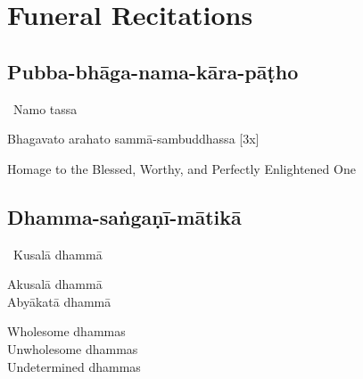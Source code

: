 \ifdesktopversion
{}
\else
{}
\fi

\chapter{Funeral Recitations}

\clearpage

\section{Pubba-bhāga-nama-kāra-pāṭho}
\label{pubba-bhaga-nama-kara-patho}

\begin{pali-leader}
  \anglebracketleft\ \hspace{-0.5mm}Namo tassa \hspace{-0.5mm}\anglebracketright\
\end{pali-leader}
\begin{pali-hangtogether}
Bhagavato arahato sammā-sambuddhassa \hfill{[3x]}
\end{pali-hangtogether}

\begin{english}
  Homage to the Blessed, Worthy, and Perfectly Enlightened One
\end{english}

\vspace{1em}

\section{Dhamma-saṅgaṇī-mātikā}
\label{dhamma-sangani-matika}

\begin{pali-leader}
  \anglebracketleft\ \hspace{-0.5mm}Kusalā dhammā \hspace{-0.5mm}\anglebracketright\
\end{pali-leader}
\begin{pali-hangtogether}
  Akusalā dhammā\\
  Abyākatā dhammā
\end{pali-hangtogether}

\begin{english-verses}
  Wholesome dhammas\\
  Unwholesome dhammas\\
  Undetermined dhammas
\end{english-verses}

